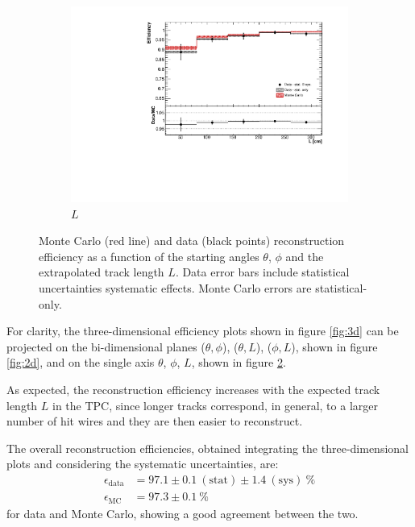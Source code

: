 \documentclass[a4paper,11pt]{article}
\begin{document}
\begin{figure}[htbp]
\begin{center}
\begin{subfigure}{0.5\textwidth}
      \includegraphics[width=\linewidth]{figures/l.pdf}
      \caption{$L$} \label{fig:l}
    \end{subfigure}
    \caption{Monte Carlo (red line) and data (black points) reconstruction efficiency as a function of the starting angles $\theta$, $\phi$ and the extrapolated track length $L$. Data error bars include statistical uncertainties systematic effects. Monte Carlo errors are statistical-only.}\label{fig:1d}
  \end{center}
\end{figure}

For clarity, the three-dimensional efficiency plots shown in figure \ref{fig:3d} can be projected on the bi-dimensional planes ($\theta,\phi$), ($\theta,L$), ($\phi,L$), shown in figure \ref{fig:2d}, and on the single axis $\theta$, $\phi$, $L$, shown in figure \ref{fig:1d}.

As expected, the reconstruction efficiency increases with the expected track length $L$ in the TPC, since longer tracks correspond, in general, to a larger number of hit wires and they are then easier to reconstruct.


The overall reconstruction efficiencies, obtained integrating the three-dimensional plots and considering the systematic uncertainties, are:
\begin{align*}
\epsilon_{\mathrm{data}} &= 97.1 \pm 0.1~\mathrm{(stat)} \pm 1.4~\mathrm{(sys)}~\%\\
\epsilon_{\mathrm{MC}} &= 97.3 \pm 0.1~\%
\end{align*} for data and Monte Carlo, showing a good agreement between the two.
\end{document}

